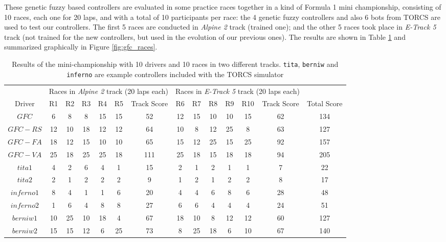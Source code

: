 \documentclass[conference]{IEEEtran}
\begin{document}
These genetic fuzzy based controllers are evaluated in some practice races together in a kind of Formula 1 mini championship, consisting of 10 races, each one for 20 laps, and with a total of 10 participants per race: the 4 genetic fuzzy controllers and also 6 bots from TORCS are used to test our controllers. The first 5 races are conducted in \textit{Alpine 2} track (trained one); and the other 5 races took place in \textit{E-Track 5} track (not trained for the new controllers, but used in the evolution of our previous ones).
The results are shown in Table \ref{tab:chsresults} and summarized graphically in Figure \ref{fig:gfc_races}. 
%
\begin{table}[ht]
  \centering
  {\scriptsize
    \caption{ Results of the mini-championship with 10 drivers and 10
      races in two different tracks. {\tt tita}, {\tt berniw} and {\tt
      inferno} are example controllers included with the TORCS
    simulator \cite{torcs4}}
    {
			\begin{tabular}{|c||c|c|c|c|c|c||c|c|c|c|c|c||c|}
				\hline
			&\multicolumn{6}{|c|}{Races in \textit{Alpine 2} track (20 laps each)} &	\multicolumn{6}{|c|}{Races in \textit{E-Track 5} track (20 laps each)}&\\
					\cline{2-13}
Driver&{R1}&{R2}&{R3}&{R4}&{R5}&Track Score&{R6}&{R7}&{R8}& {R9}&{R10}&Track Score& Total Score\\
				\hline
$GFC$	&	6&	8&	8&	15&15		&52&	12&	15&	10&	10&	15&62&134\\
$GFC-RS$&	12&	10&	18&	12&12		&64&	10&	8&	12&	25&	8&63&127\\
$GFC-FA$&	18&	12&	15&	10&10		&65&	15&	12&	25&	15&	25&92&157\\
$GFC-VA$&	25&	18&	25&	25&18		&111&	25&	18&	15&	18&18	&94&205\\
$tita1$	&	4&	2&	6&	4&1			&15&	2&	1&	2&	1&	1&7&22\\
$tita2$	&	2&	1&	2&	2&2			&9&	1&	2&	1&	2&	2&8&17\\
$inferno1$&	8&	4&	1&	1&6			&20&	4&	4&	6&	8&	6&28&48\\
$inferno2$&	1&	6&	4&	8&8			&27&	6&	6&	4&	4&	4&24&51\\
$berniw1$&	10&	25&	10&	18&4		&67&	18&	10&	8&	12&	12&60&127\\
$berniw2$&	15&	15&	12&	6&25		&73&	8&	25&	18&	6&	10&67&140\\
\hline
				
			\end{tabular}
		}\label{tab:chsresults}
	}
\end{table}
%
\end{document}
